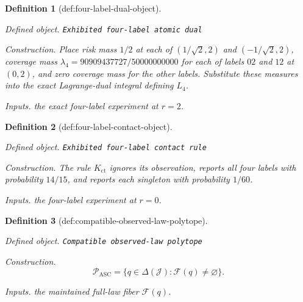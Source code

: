 \documentclass{article}
\newtheorem{definition}{Definition}
\begin{document}
\begin{definition}[def:four-label-dual-object]\label{def:four-label-dual-object}
\par\smallskip\noindent\emph{Defined object.} \texttt{Exhibited four-\allowbreak{}label atomic dual}
\par\smallskip\noindent\emph{Construction.} Place risk mass \(1/2\) at each of \((1/\sqrt2,2)\) and \((-1/\sqrt2,2)\), coverage mass \(\lambda_4=90909437727/50000000000\) for each of labels \(02\) and \(12\) at \((0,2)\), and zero coverage mass for the other labels. Substitute these measures into the exact Lagrange-dual integral defining \(L_4\).
\par\smallskip\noindent\emph{Inputs.} the exact four-label experiment at \(r=2\).
\end{definition}

\begin{definition}[def:four-label-contact-object]\label{def:four-label-contact-object}
\par\smallskip\noindent\emph{Defined object.} \texttt{Exhibited four-\allowbreak{}label contact rule}
\par\smallskip\noindent\emph{Construction.} The rule \(K_{\mathrm{ct}}\) ignores its observation, reports all four labels with probability \(14/15\), and reports each singleton with probability \(1/60\).
\par\smallskip\noindent\emph{Inputs.} the four-label experiment at \(r=0\).
\end{definition}

\begin{definition}[def:compatible-observed-law-polytope]\label{def:compatible-observed-law-polytope}
\par\smallskip\noindent\emph{Defined object.} \texttt{Compatible observed-\allowbreak{}law polytope}
\par\smallskip\noindent\emph{Construction.} \[
 \mathcal P_{\mathrm{ASC}}
 =\{q\in\Delta(\mathcal J):\mathcal F(q)\ne\varnothing\}.
\]
\par\smallskip\noindent\emph{Inputs.} the maintained full-law fiber \(\mathcal F(q)\).
\end{definition}
\end{document}
